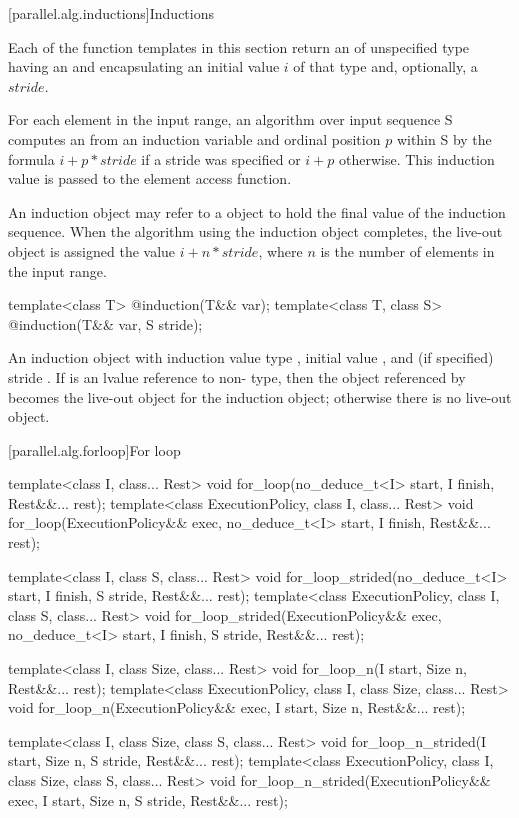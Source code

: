 [parallel.alg.inductions]{Inductions}

\pnum
Each of the function templates in this section return an  of unspecified type having an  and encapsulating an initial value $i$ of that type and, optionally, a $stride$.

\pnum
For each element in the input range, an algorithm over input sequence S computes an  from an induction variable and ordinal position $p$ within S by the formula $i + p * stride$ if a stride was specified or $i + p$ otherwise. This induction value is passed to the element access function.

\pnum
An induction object may refer to a  object to hold the final value of the induction sequence. When the algorithm using the induction object completes, the live-out object is assigned the value $i + n * stride$, where $n$ is the number of elements in the input range.

\begin{itemdecl}
template<class T>
  @\unspec@ induction(T&& var);
template<class T, class S>
  @\unspec@ induction(T&& var, S stride);
\end{itemdecl}

\begin{itemdescr}
\pnum
\returns An induction object with induction value type , initial value , and (if specified) stride . If  is an lvalue reference to non- type, then the object referenced by  becomes the live-out object for the induction object; otherwise there is no live-out object.
\end{itemdescr}

[parallel.alg.forloop]{For loop}

\begin{itemdecl}
template<class I, class... Rest>
  void for_loop(no_deduce_t<I> start, I finish, Rest&&... rest);
template<class ExecutionPolicy, class I, class... Rest>
  void for_loop(ExecutionPolicy&& exec, no_deduce_t<I> start, I finish, Rest&&... rest);

template<class I, class S, class... Rest>
  void for_loop_strided(no_deduce_t<I> start, I finish, S stride, Rest&&... rest);
template<class ExecutionPolicy, class I, class S, class... Rest>
  void for_loop_strided(ExecutionPolicy&& exec, no_deduce_t<I> start, I finish, S stride,
                        Rest&&... rest);

template<class I, class Size, class... Rest>
  void for_loop_n(I start, Size n, Rest&&... rest);
template<class ExecutionPolicy, class I, class Size, class... Rest>
  void for_loop_n(ExecutionPolicy&& exec, I start, Size n, Rest&&... rest);

template<class I, class Size, class S, class... Rest>
  void for_loop_n_strided(I start, Size n, S stride, Rest&&... rest);
template<class ExecutionPolicy, class I, class Size, class S, class... Rest>
  void for_loop_n_strided(ExecutionPolicy&& exec, I start, Size n, S stride, Rest&&... rest);
\end{itemdecl}

